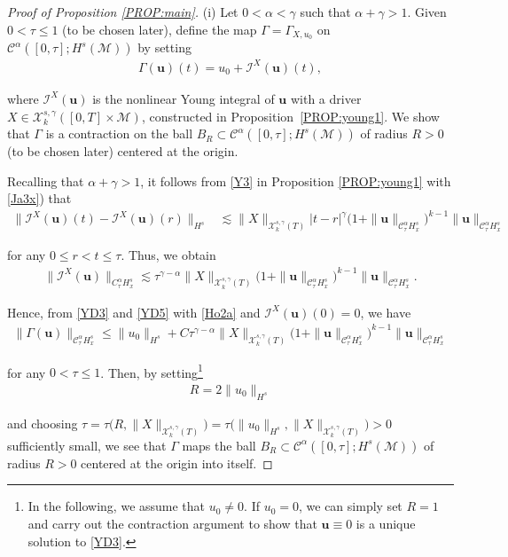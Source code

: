 \documentclass[letterpaper, 11pt,  reqno]{amsart}
\newcommand{\1}{\hspace{0.5mm}\text{I}\hspace{0.5mm}}
\newcommand{\I}{\mathcal{I}}
\newcommand{\noi}{\noindent}
\newcommand{\CC}{\mathcal{C}}
\newcommand{\al}{\alpha}
\newcommand{\g}{\gamma}
\newcommand{\G}{\Gamma}
\newcommand{\les}{\lesssim}
\newcommand{\M}{\mathcal{M}}
\newcommand{\cC}{\mathcal{C}}
\newcommand{\cX}{\mathcal{X}}
\newcommand{\uu}{\mathbf{u}}
\numberwithin{equation}{section}
\numberwithin{theorem}{section}
\begin{document}
\begin{proof}[Proof of Proposition \ref{PROP:main}]
(i) 
Let $0 < \al < \g$ such that 
 $\al + \g>1$. 
Given $0 < \tau \le 1$ (to be chosen later), 
 define 
 the map
$\G = \G_{X, u_0}$ on $\cC^\al([0, \tau]; H^s(\M))$
by setting
\begin{align}
\G(\uu)(t) = u_0 + \I^X(\uu)(t), 
\label{YD3}
\end{align}

\noi

\noi
where $\I^X(\uu)$ is the nonlinear Young integral of 
$\uu$ with a driver 
$X \in \cX^{s, \g}_k([0, T]\times \M)$, 
constructed in Proposition~\ref{PROP:young1}.
We show that $\G$ is a contraction on 
the ball $B_R\subset 
\cC^\al([0, \tau]; H^s(\M))$
of radius $R > 0$ 
(to be chosen later)
centered at the origin.

Recalling that $\al + \g > 1$, 
it follows 
from  \eqref{Y3} in 
Proposition \ref{PROP:young1}
with \eqref{Ja3x}) that 
\begin{align*}
\|\I^X(\uu)(t) - \I^X(\uu)(r)\|_{H^s}
& \les 
\|X\|_{\cX^{s, \g}_k(T)}
|t-r|^{\g}
\big(1+ 
\|\uu\|_{\CC^\al_{\tau } H^s_x}\big)^{k-1}
\|\uu\|_{\CC^\al_{\tau } H^s_x}
\end{align*}


\noi
for any $0 \le r < t \le \tau$.
Thus, we obtain 
\begin{align}
\label{YD5}
\|\I^X(\uu)\|_{C^\al_\tau H^s_x}
\les \tau^{\g - \al}
\|X\|_{\cX^{s, \g}_k(T)}
\big(1+ 
\|\uu\|_{\CC^\al_{\tau } H^s_x}\big)^{k-1}
\|\uu\|_{\CC^\al_{\tau } H^s_x}.
\end{align}



\noi
Hence, from \eqref{YD3}
and \eqref{YD5} with 
\eqref{Ho2a} and 
$\I^X(\uu)(0) = 0$, 
we have 
\begin{align}
\label{YD5a}
\|\G(\uu)\|_{\CC^\al_\tau H^s_x}
\le \|u_0\|_{H^s} +  C\tau^{\g - \al}
\|X\|_{\cX^{s, \g}_k(T)}
\big(1+ 
\|\uu\|_{\CC^\al_{\tau } H^s_x}\big)^{k-1}
\|\uu\|_{\CC^\al_{\tau } H^s_x}
\end{align}

\noi
for any $0 < \tau \le 1$.
Then, by setting\footnote{In the following, we assume that $u_0 \ne 0$.
If $u_0 = 0$, we can simply set $R = 1$ and carry out the contraction argument
to show that  $\uu \equiv 0$ is a unique solution to \eqref{YD3}.} 
\begin{align}
R = 2 \|u_0\|_{H^s} 
\label{YD5b}
\end{align}

\noi
and choosing 
$\tau = 
\tau\big(R, \|X\|_{\cX^{s, \g}_k(T)}\big) 
= 
\tau\big(\|u_0\|_{H^s}, \|X\|_{\cX^{s, \g}_k(T)}\big) >0$
sufficiently small, 
we see that 
$\G$ maps the ball $B_R\subset 
\cC^\al([0, \tau]; H^s(\M))$
of radius $R > 0$ 
centered at the origin into itself.






\end{proof}
\end{document}
